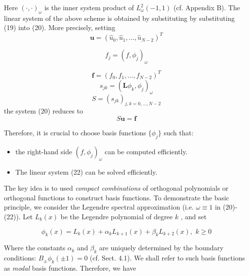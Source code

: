 Here $ \left( \cdot, \cdot \right)_{ \omega } $ is the inner system product of $ L^{ 2 }_{ \omega } \left( -1,1 \right) $ (cf. Appendix B).
\indent The linear system of the above scheme is obtained by substituting by substituting (19) into (20). More precisely, setting
\[
	\mathbf{ u } = \left( \widehat{ u }_{ 0 }, \widehat{ u }_{ 1 }, \ldots, \widehat{ u }_{ N-2 } \right)^{ T }
\]

\[
	f_{ j } = \left( f, \phi_{ j } \right)_{ \omega }
\]

\[
	\mathbf{ f } = \left( f_{ 0 }, f_{ 1 }, \ldots, f_{ N-2 } \right)^{ T }
\]
\[
	s_{ jk } = \left( \mathbf{ L } \phi_{ k }, \phi_{ j } \right)_{ \omega }
\]
\[
	S = \left( s_{ jk } \right)_{ j,k=0,\ldots,N-2 }
\]
the system (20) reduces to 
\[
S \mathbf{ u } = \mathbf{ f }
\]

Therefore, it is crucial to choose basis functions $ \{ \phi_{ j } \} $ such that:

\begin{itemize}
	\item the right-hand side $ \left( f, \phi_{ j } \right)_{ \omega } $ can be computed efficiently.
	\item The linear system (22) can be solved efficiently.
\end{itemize}

The key idea is to used \textit{compact combinations} of orthogonal polynomials or orthogonal functions to construct basis functions. To demonstrate the basic principle, we consider the Legendre spectral approximation (i.e. $ \omega \equiv 1 $ in (20)-(22)). Let $ L_{ k }(x) $ be the Legendre polynomial of degree $ k $ , and set

\begin{equation}
	\phi_{ k }(x) = L_{ k }(x) + \alpha_{ k } L_{ k+1 } (x) + \beta_{ k } L_{ k+2 } (x), \hspace{4pt} k \geq 0
\end{equation}

Where the constants $ \alpha_{ k } $ and $ \beta_{ k } $ are uniquely determined by the boundary conditions: $ B_{ \pm } \phi_{ k } \left( \pm 1 \right) = 0 $ (cf. Sect. 4.1). We shall refer to such basis functions as \textit{modal} basis functions. Therefore, we have

